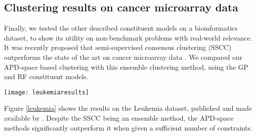 
\subsection*{Clustering results on cancer microarray data}

Finally, we tested the other described constituent models on a bioinformatics dataset, to show its utility on non-benchmark problems with real-world relevance. It was recently proposed that semi-supervised consensus clustering (SSCC) outperforms the state of the art on cancer microarray data \citep{wang2014semi}. We compared our APD-space based clustering with this ensemble clustering method, using the GP and RF constituent models. 

\begin{figure*}[h]
	\centering
	\texttt{[image: leukemiaresults]}
	
	\caption[Semi-supervised clustering results on cancer microarray data]{\textbf{Semi-supervised clustering results on cancer microarray data} from \citep{golub1999molecular}, compared to the state of the art semi-supervised consensus clustering method by \citep{wang2014semi}.}
	\label{leukemia}
\end{figure*}

Figure \ref{leukemia} shows the results on the Leukemia dataset, published and made available by \citep{golub1999molecular}. Despite the SSCC being an ensemble method, the APD-space methods significantly outperform it when given a sufficient number of constraints.


